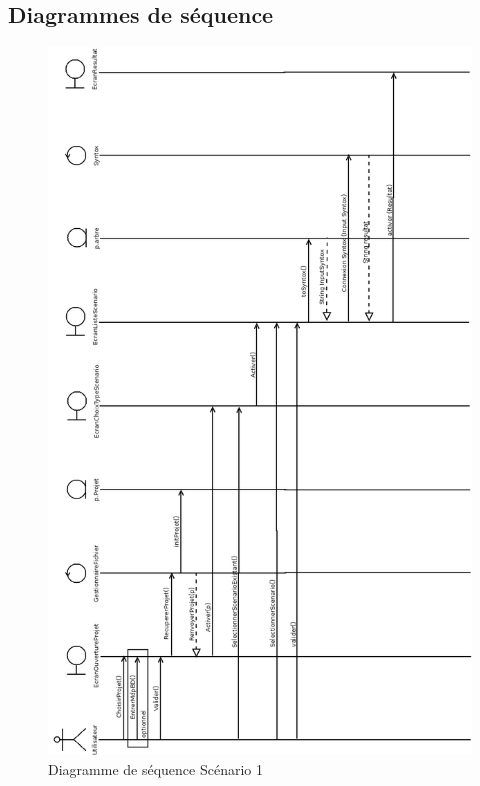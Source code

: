 \documentclass[12pt]{report}
\begin{document}
\FloatBarrier

\subsection{Diagrammes de séquence}


\begin{figure}[h!]
\begin{center}
\includegraphics[scale=0.34]{DiagSeq.png}
\caption{Diagramme de séquence Scénario 1}
\end{center}
\end{figure}
\end{document}
